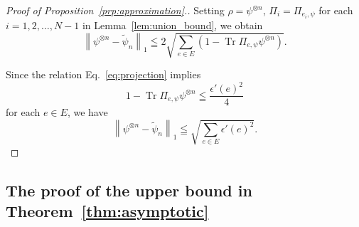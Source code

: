 \documentclass[preprintnumbers,aps,amsmath,amssymb,pra,twocolumn,showpacs,superscriptaddress,floatfix]{revtex4-1}
\DeclareMathOperator{\tr}{Tr}
\theoremstyle{plain}
\theoremstyle{definition}
\theoremstyle{remark}
\begin{document}
\begin{proof}[Proof of Proposition~\ref{prp:approximation}.]
    Setting $\rho=\psi^{\otimes n}$, $\Pi_i = \Pi_{e_i,\psi}$ for each $i=1,2,\ldots,N-1$ in Lemma~\ref{lem:union_bound}, we obtain
    \[
        \left\|\psi^{\otimes n}-\tilde\psi_n\right\|_1\leqq 2\sqrt{\sum_{e\in E}\left(1-\tr \Pi_{e,\psi}\psi^{\otimes n}\right)}.
    \]

    Since the relation Eq.~\eqref{eq:projection} implies
    \[
        1-\tr \Pi_{e,\psi}\psi^{\otimes n}\leqq \frac{{\epsilon'(e)}^2}{4}
    \]
    for each $e\in E$, we have
    \[
        \left\|\psi^{\otimes n}-\tilde\psi_n\right\|_1\leqq\sqrt{\sum_{e\in E}{\epsilon'(e)}^2}.
    \]
\end{proof}


\subsection{The proof of the upper bound in Theorem~\ref{thm:asymptotic}}
\end{document}

